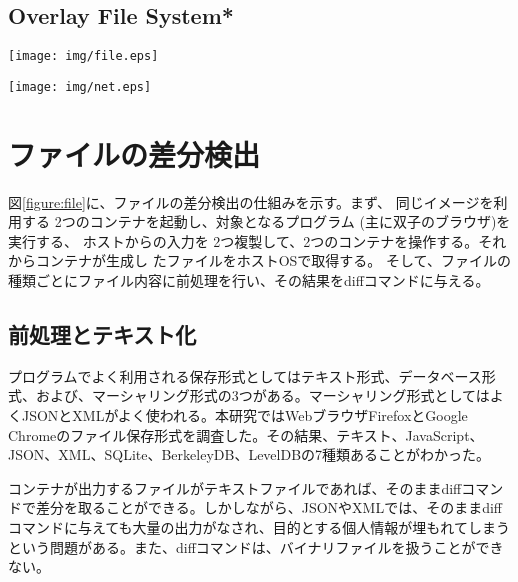 \documentclass[a4paper,twocolumn,10pt]{jarticle}
\begin{document}
\subsection{Overlay File System*}

\begin{figure*}[ht]
\begin{center}
\texttt{[image: img/file.eps]}
\caption{Docker Overlay Filesystemによるファイル差分検出}
\label{figure:file}
\end{center}
\end{figure*}

\begin{figure*}[ht]
\begin{center}
\texttt{[image: img/net.eps]}
\caption{MITM-proxyを用いたHTTPのメッセージの差分検出}
\label{figure:network}
\end{center}
\end{figure*}


\section{ファイルの差分検出}
\label{cha:file}

図\ref{figure:file}に、ファイルの差分検出の仕組みを示す。まず、 同じイメージを利用する 2つのコンテナを起動し、対象となるプログラム (主に双子のブラウザ)を 実行する、 ホストからの入力を 2つ複製して、2つのコンテナを操作する。それからコンテナが生成し たファイルをホストOSで取得する。 そして、ファイルの種類ごとにファイル内容に前処理を行い、その結果をdiffコマンドに与える。

\subsection{前処理とテキスト化}
\label{sec:prep}
プログラムでよく利用される保存形式としてはテキスト形式、データベース形式、および、マーシャリング形式の3つがある。マーシャリング形式としてはよくJSONとXMLがよく使われる。本研究ではWebブラウザFirefoxとGoogle Chromeのファイル保存形式を調査した。その結果、テキスト、JavaScript、JSON、XML、SQLite、BerkeleyDB、LevelDBの7種類あることがわかった。

コンテナが出力するファイルがテキストファイルであれば、そのままdiffコマンドで差分を取ることができる。しかしながら、JSONやXMLでは、そのままdiffコマンドに与えても大量の出力がなされ、目的とする個人情報が埋もれてしまうという問題がある。また、diffコマンドは、バイナリファイルを扱うことができない。
\end{document}
